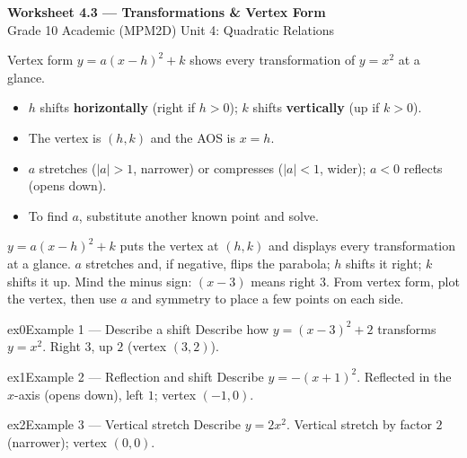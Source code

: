 \documentclass[11pt]{article}
\begin{document}
\begin{center}
{\LARGE\bfseries\color{titleblue}Worksheet 4.3 --- Transformations \& Vertex Form}\\[2pt]
{\small Grade 10 Academic (MPM2D) \textperiodcentered{} Unit 4: Quadratic Relations}
\end{center}

\begin{ideabox}
Vertex form $y=a(x-h)^2+k$ shows every transformation of $y=x^2$ at a glance.
\begin{itemize}[leftmargin=*,itemsep=2pt]
  \item $h$ shifts \textbf{horizontally} (right if $h>0$); $k$ shifts \textbf{vertically} (up if $k>0$).
  \item The vertex is $(h,k)$ and the AOS is $x=h$.
  \item $a$ stretches ($|a|>1$, narrower) or compresses ($|a|<1$, wider); $a<0$ reflects (opens down).
  \item To find $a$, substitute another known point and solve.
\end{itemize}
\end{ideabox}

\begin{learnbox}
$y=a(x-h)^2+k$ puts the vertex at $(h,k)$ and displays every transformation at a glance.
$a$ stretches and, if negative, flips the parabola; $h$ shifts it right; $k$ shifts it up. Mind the minus sign: $(x-3)$ means right $3$.
From vertex form, plot the vertex, then use $a$ and symmetry to place a few points on each side.
\end{learnbox}


\begin{example}{ex0}{Example 1 --- Describe a shift}
Describe how $y=(x-3)^2+2$ transforms $y=x^2$.
\soln Right $3$, up $2$ (vertex $(3,2)$).
\end{example}

\begin{example}{ex1}{Example 2 --- Reflection and shift}
Describe $y=-(x+1)^2$.
\soln Reflected in the $x$-axis (opens down), left $1$; vertex $(-1,0)$.
\end{example}

\begin{example}{ex2}{Example 3 --- Vertical stretch}
Describe $y=2x^2$.
\soln Vertical stretch by factor $2$ (narrower); vertex $(0,0)$.
\end{example}
\end{document}
